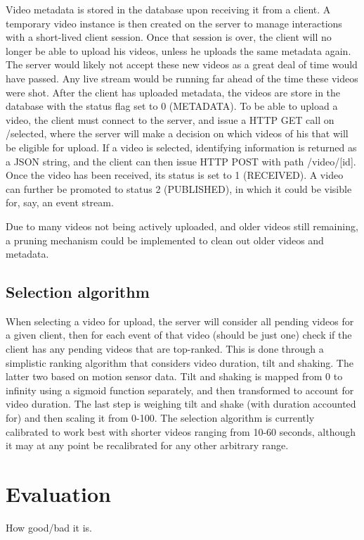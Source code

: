 \documentclass[conference]{IEEEtran}
\begin{document}
Video metadata is stored in the database upon receiving it from a client. A temporary video instance
is then created on the server to manage interactions with a short-lived client session. Once that session
is over, the client will no longer be able to upload his videos, unless he uploads the same metadata again.
The server would likely not accept these new videos as a great deal of time would have passed. Any live stream
would be running far ahead of the time these videos were shot. After the client has uploaded metadata, the
videos are store in the database with the status flag set to 0 (METADATA). To be able to upload a video,
the client must connect to the server, and issue a HTTP GET call on /selected, where the server will make
a decision on which videos of his that will be eligible for upload. If a video is selected, identifying
information is returned as a JSON string, and the client can then issue HTTP POST with path /video/[id].
Once the video has been received, its status is set to 1 (RECEIVED). A video can further be promoted to
status 2 (PUBLISHED), in which it could be visible for, say, an event stream.

Due to many videos not being actively uploaded, and older videos still remaining, a pruning mechanism could
be implemented to clean out older videos and metadata.

\subsection{Selection algorithm}

When selecting a video for upload, the server will consider all pending videos for a given client,
then for each event of that video (should be just one) check if the client has any pending videos that
are top-ranked. This is done through a simplistic ranking algorithm that considers video duration, tilt
and shaking. The latter two based on motion sensor data. Tilt and shaking is mapped from 0 to infinity
using a sigmoid function separately, and then transformed to account for video duration. The last step
is weighing tilt and shake (with duration accounted for) and then scaling it from 0-100.
The selection algorithm is currently calibrated to work best with shorter videos ranging from 10-60 seconds,
although it may at any point be recalibrated for any other arbitrary range.

\section{Evaluation}
How good/bad it is.
\end{document}
